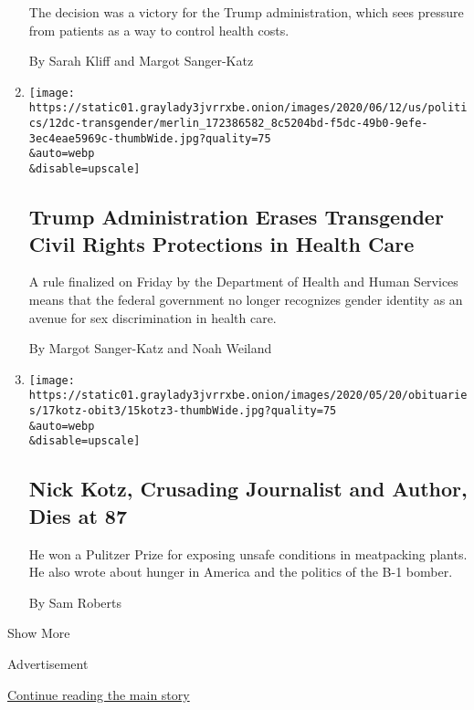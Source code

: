\begin{enumerate}
  The decision was a victory for the Trump administration, which sees
  pressure from patients as a way to control health costs.

  By Sarah Kliff and Margot Sanger-Katz
\item
  \href{/2020/06/12/us/politics/trump-transgender-rights.html}{}

  \texttt{[image: https://static01.graylady3jvrrxbe.onion/images/2020/06/12/us/politics/12dc-transgender/merlin\_172386582\_8c5204bd-f5dc-49b0-9efe-3ec4eae5969c-thumbWide.jpg?quality=75\\\&auto=webp\\\&disable=upscale]}

  \hypertarget{trump-administration-erases-transgender-civil-rights-protections-in-health-care}{%
  \subsection{Trump Administration Erases Transgender Civil Rights
  Protections in Health
  Care}\label{trump-administration-erases-transgender-civil-rights-protections-in-health-care}}

  A rule finalized on Friday by the Department of Health and Human
  Services means that the federal government no longer recognizes gender
  identity as an avenue for sex discrimination in health care.

  By Margot Sanger-Katz and Noah Weiland
\item
  \href{/2020/05/15/business/media/nick-kotz-dead.html}{}

  \texttt{[image: https://static01.graylady3jvrrxbe.onion/images/2020/05/20/obituaries/17kotz-obit3/15kotz3-thumbWide.jpg?quality=75\\\&auto=webp\\\&disable=upscale]}

  \hypertarget{nick-kotz-crusading-journalist-and-author-dies-at-87}{%
  \subsection{Nick Kotz, Crusading Journalist and Author, Dies at
  87}\label{nick-kotz-crusading-journalist-and-author-dies-at-87}}

  He won a Pulitzer Prize for exposing unsafe conditions in meatpacking
  plants. He also wrote about hunger in America and the politics of the
  B-1 bomber.

  By Sam Roberts
\end{enumerate}

Show More

Advertisement

\protect\hyperlink{after-mid1}{Continue reading the main story}

